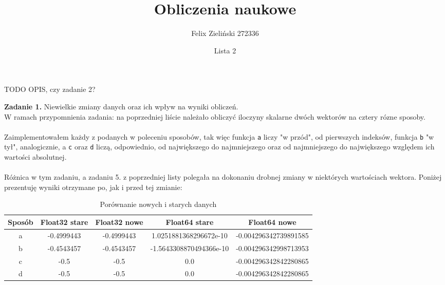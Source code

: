 \documentclass[15pt, a4paper]{article}
\title{Obliczenia naukowe}
\author{Felix Zieliński 272336}
\date{Lista 2}
\begin{document}
\maketitle
TODO OPIS, czy zadanie 2?

\vspace{0.5cm}

\noindent\hrulefill


\vspace{0.5cm}

\noindent\textbf{Zadanie 1.} Niewielkie zmiany danych oraz ich wpływ na wyniki obliczeń.\\

\noindent W ramach przypomnienia zadania: na poprzedniej liście  należało obliczyć iloczyny skalarne dwóch wektorów na cztery rózne sposoby.\\\\
Zaimplementowałem każdy z podanych w poleceniu sposobów, tak więc funkcja \verb|a| liczy "w przód", od pierwszych indeksów, funkcja \verb|b| "w tył", analogicznie, a \verb|c| oraz \verb|d| liczą, odpowiednio, od największego do najmniejszego oraz od najmniejszego do największego względem ich wartości absolutnej.\\\\
Różnica w tym zadaniu, a zadaniu 5. z poprzedniej listy polegała na dokonaniu drobnej zmiany w niektórych wartościach wektora. Poniżej prezentuję wyniki otrzymane po, jak i przed tej zmianie:


\begin{table}[ht]
    \begin{adjustbox}{max width=\textwidth}
    \begin{tabular}{|c|c|c|c|c|}
        \hline 
        Sposób & Float32 stare & Float32 nowe & Float64 stare & Float64 nowe \\ \hline
        a & -0.4999443 & -0.4999443 & 1.0251881368296672e-10 & -0.004296342739891585 \\ \hline
        b & -0.4543457 & -0.4543457 & -1.5643308870494366e-10 & -0.004296342998713953 \\ \hline
        c & -0.5 & -0.5 & 0.0 & -0.004296342842280865 \\ \hline
        d & -0.5 & -0.5 & 0.0 & -0.004296342842280865 \\ \hline
    \end{tabular}
    \end{adjustbox}
    \caption{Porównanie nowych i starych danych}
    \label{tab:products}
\end{table}
\end{document}
